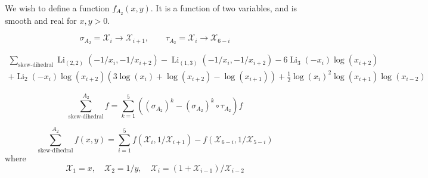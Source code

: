 \documentclass[12pt]{article}
\DeclareMathOperator{\Li}{Li}
\begin{document}
\thispagestyle{fancyplain}
 
\fancyhf{}
 
\cfoot{\fancyplain{}{\thepage}}


We wish to define a function $f_{A_2}(x,y)$. It is a function of two variables, and is smooth and real for $x,y>0$. 

\begin{equation}
	\sigma_{A_2} = \mathcal{X}_i \to \mathcal{X}_{i+1}, \qquad \tau_{A_2} = \mathcal{X}_i \to \mathcal{X}_{6-i}
\end{equation}

\begin{multline}
	\sum_{\text{skew-dihedral}} \Li_{(2, 2)}(-1/x_i, -1/x_{i+2}) - \Li_{(1, 3)}(-1/x_i, -1/x_{i+2})
	-6\Li_3(-x_i)\log(x_{i+2})\\+\Li_2(-x_i)\log(x_{i+2})\left(3\log(x_i)+\log(x_{i+2})-\log(x_{i+1})\right)+\frac12\log(x_{i})^2\log(x_{i+1})\log(x_{i-2})
\end{multline}

\begin{equation}
	\sum_{\text{skew-dihedral}}^{A_2} f= \sum_{k=1}^5 \left(\left(\sigma_{A_2}\right)^k - \left(\sigma_{A_2}\right)^k\circ\tau_{A_2}\right) f
\end{equation}

\begin{equation}
	\sum_{\text{skew-dihedral}}^{A_2} f(x,y)=\sum_{i=1}^5f(\mathcal{X}_i,1/\mathcal{X}_{i+1})-f(\mathcal{X}_{6-i},1/\mathcal{X}_{5-i})
\end{equation}
where
\begin{equation}
	\mathcal{X}_1 = x, \quad \mathcal{X}_2 = 1/y, \quad \mathcal{X}_i = (1+\mathcal{X}_{i-1})/\mathcal{X}_{i-2}
\end{equation}
\end{document}
